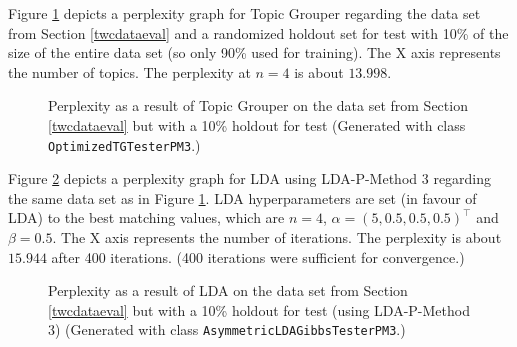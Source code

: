 \documentclass[10pt, a4paper, oneside]{article}
\begin{document}
Figure \ref{perplexity1} depicts a perplexity graph for Topic Grouper regarding the data set from Section \ref{twcdataeval} and a randomized holdout set for test with 10\% of the size of the entire data set (so only 90\% used for training). The X axis represents the number of topics.
The perplexity at $n = 4$ is about $13.998$.

\begin{figure}
\caption{Perplexity as a result of Topic Grouper on the data set from Section \ref{twcdataeval} but with a 10\% holdout for test (Generated with class \texttt{OptimizedTGTesterPM3}.)}
\label{perplexity1}
\end{figure}

Figure \ref{perplexity2} depicts a perplexity graph for LDA using LDA-P-Method 3 regarding the same data set as in Figure \ref{perplexity1}. LDA hyperparameters are set (in favour of LDA) to the best matching values, which are $n = 4$, $\alpha = (5, 0.5, 0.5, 0.5)^\top$ and $\beta=0.5$. The X axis represents the number of iterations. The perplexity is about $15.944$ after 400 iterations. (400 iterations were sufficient for convergence.)

\begin{figure}
\caption{Perplexity as a result of LDA on the data set from Section \ref{twcdataeval} but with a 10\% holdout for test (using LDA-P-Method 3) (Generated with class \texttt{AsymmetricLDAGibbsTesterPM3}.)}
\label{perplexity2}
\end{figure}
\end{document}
